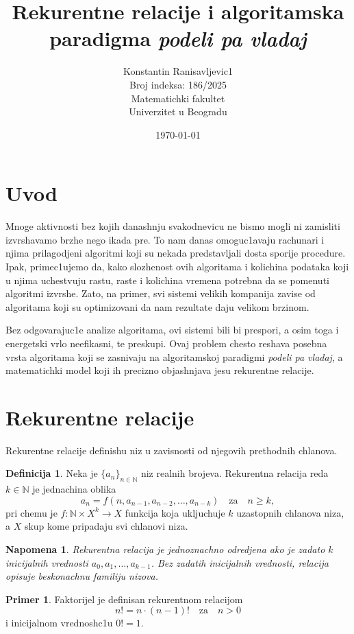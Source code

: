 \documentclass{article}
\title{Rekurentne relacije i algoritamska paradigma \emph{podeli pa vladaj}}
\author{Konstantin Ranisavljevic1 \\ Broj indeksa: 186/2025 \\ Matematichki fakultet \\ Univerzitet u Beogradu}
\date{\today}
\newtheorem{napomena}{Napomena}[section]
\theoremstyle{definition}
\newtheorem{definicija}{Definicija}[section]
\newtheorem{primer}{Primer}[section]
\begin{document}
\maketitle
\tableofcontents

\section*{Uvod}
Mnoge aktivnosti bez kojih danashnju svakodnevicu ne bismo mogli ni zamisliti izvrshavamo brzhe nego ikada pre. To nam danas o\-mo\-gu\-c1a\-va\-ju rachunari i njima prilagodjeni algoritmi koji su nekada predstavljali dosta sporije procedure. Ipak, primec1ujemo da, kako slozhenost ovih algoritama i kolichina podataka koji u njima uchestvuju rastu, raste i kolichina vremena potrebna da se pomenuti algoritmi izvrshe. Zato, na primer, svi sistemi velikih kompanija zavise od algoritama koji su optimizovani da nam rezultate daju velikom br\-zi\-nom.


Bez odgovarajuc1e analize algoritama, ovi sistemi bili bi pre\-spo\-ri, a osim toga i energet{}ski vrlo neefikasni, te preskupi. Ovaj problem chesto reshava posebna vrsta algoritama koji se zasnivaju na algoritamskoj paradigmi \emph{podeli pa vladaj}, a matematichki model koji ih precizno objashnjava jesu rekurentne relacije.

\section{Rekurentne relacije}
Rekurentne relacije definishu niz u zavisnosti od njegovih pret\-hod\-nih chlanova.

\begin{definicija}
Neka je $\{a_n\}_{n\in\mathbb{N}}$ niz realnih brojeva. Rekurentna relacija reda $k\in\mathbb{N}$ je jednachina oblika $$a_n = f(n, a_{n-1}, a_{n-2}, \ldots, a_{n-k})\quad \text{za}\quad n\geqslant k,$$ pri chemu je $f:\mathbb{N}\times X^k \to X$ funkcija koja ukljuchuje $k$ uzastopnih chlanova niza, a $X$ skup kome pripadaju svi chlanovi niza.
\end{definicija}

\begin{napomena}
Rekurentna relacija je jednoznachno odredjena ako je zadato $k$ inicijalnih vrednosti $a_0,a_1,\ldots,a_{k-1}$. Bez zadatih inicijalnih vred\-no\-sti, relacija opisuje beskonachnu familiju nizova.
\end{napomena}

\begin{primer}
Faktorijel je definisan rekurentnom relacijom $$n! = n\cdot(n-1)!\quad\text{za}\quad n>0$$ i inicijalnom vrednosh{}c1u $0! = 1$.
\end{primer}
\end{document}
